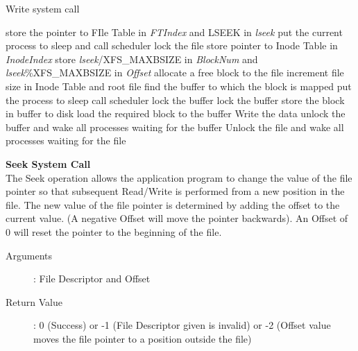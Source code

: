 \documentclass[10pt]{article}
\begin{document}
\begin{algorithm}
\caption{Write system call}
\begin{algorithmic}
\ENDIF
{}
\ELSE 
    \STATE store the pointer to FIle Table in  \textit{FTIndex} and LSEEK in  \textit{lseek}
\ENDIF
{}
    \STATE put the current process to sleep and call scheduler
\ENDWHILE
\STATE lock the file
\STATE store pointer to Inode Table in  \textit{InodeIndex}
\STATE store \textit{lseek}/XFS\_MAXBSIZE in \textit{BlockNum} and \textit{lseek}\%XFS\_MAXBSIZE in \textit{Offset}
    \ELSE
        \STATE allocate a free block to the file
        \STATE increment file size in Inode Table and root file
    \ENDIF
\ENDIF
\STATE find the buffer to which the block is mapped
            \STATE put the process to sleep
            \STATE call scheduler
        \ENDWHILE
        \STATE lock the buffer
    \ENDIF
\ENDIF
\STATE lock the buffer
        \STATE store the block in buffer to disk
    \ENDIF
    \STATE load the required block to the buffer
\ENDIF
\STATE Write the data 
\STATE unlock the buffer and wake all processes waiting for the buffer
\STATE Unlock the file and wake all processes waiting for the file
\end{algorithmic}
\end{algorithm}
\vspace{3mm}
\textbf{Seek System Call}
\vspace{3mm}\\
The Seek operation allows the application program to change the value of the file pointer so that subsequent Read/Write is performed from a new position in the file. The new value of the file pointer is determined by adding the offset to the current value. (A negative Offset will move the pointer backwards). An Offset of 0 will reset the pointer to the beginning of the file. 
\begin{description}
	\item[Arguments]: File Descriptor and Offset
	\item[Return Value]: 0 (Success) or -1 (File Descriptor given is invalid) or -2 (Offset value moves the file pointer to a position outside the file)
\end{description} 
\end{document}
